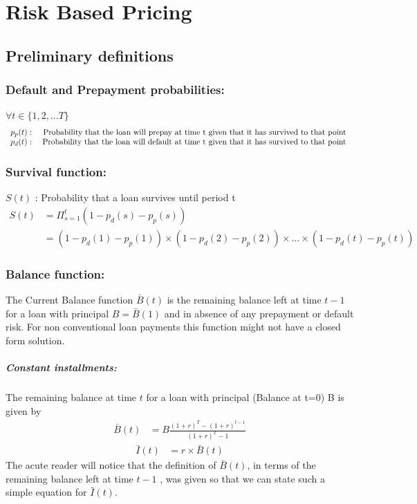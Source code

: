 
\chapter{Risk Based Pricing}
\section{ Preliminary definitions} 
\subsection{Default and Prepayment probabilities:}
$ \forall t \in \{1,2,...T\}$
\[ 
\begin{array}{rr} 
   p_p(t)  :&  \mbox{
   Probability that the loan will prepay at time t given that it has survived to that point } \\
   p_d(t)  : &  \mbox{
   Probability that the loan will default at time t given that it has survived to that point
   }
\end{array} \noindent
\] 

 \subsection{Survival function:}
$S(t)$ :   Probability that a loan survives until period t 
\begin{align}
S(t) & = \Pi_{s=1}^t (1-p_d(s) - p_p(s)) \\
 & = (1-p_d(1) - p_p(1))\times(1-p_d(2) - p_p(2))\times...\times(1-p_d(t) - p_p(t)) \nonumber
\end{align}

\subsection{Balance function: }
The Current Balance function $\bar{B}(t)$ is the remaining balance left at time $t-1$ for a loan with principal $B=\bar{B}(1)$ and in absence of any prepayment or default risk. For non conventional loan payments this function might not have a closed form solution. 


\paragraph{Constant installments:} The remaining balance at time $t$ for a loan with principal (Balance at t=0) B is given by 
\begin{align}
\bar{ B}(t)&=B\frac{(1+r)^T-(1+r)^{t-1}}{(1+r)^T-1}
\end{align}
\begin{align}
\bar{ I}(t)&=r\times \bar{ B}(t)
\end{align}
The acute reader will notice that the definition of $\bar{B}(t)$, in terms of the remaining balance left at time $t-1$ , was given so that we can state such a simple equation for $\bar{I}(t)$.


